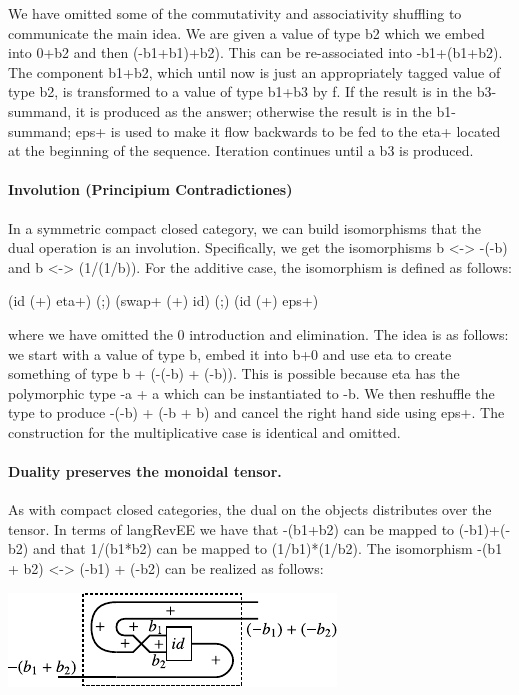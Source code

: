 \documentclass[preprint]{sigplanconf}
\begin{document}
\noindent We have omitted some of the commutativity and associativity
shuffling to communicate the main idea. We are given a value of type
{{b2}} which we embed into {{0+b2}} and then {{(-b1+b1)+b2)}}. This
can be re-associated into {{-b1+(b1+b2)}}. The component {{b1+b2}},
which until now is just an appropriately tagged value of type {{b2}},
is transformed to a value of type {{b1+b3}} by {{f}}. 
If the result is in the {{b3}}-summand, it is produced as
the answer; otherwise the result is in the {{b1}}-summand; {{eps+}} is
used to make it flow backwards to be fed to the {{eta+}} located at
the beginning of the sequence. Iteration continues until a {{b3}} is
produced.


\paragraph*{Involution (Principium Contradictiones)}

In a symmetric compact closed category, we can build isomorphisms that the
dual operation is an involution. Specifically, we get the isomorphisms 
{{b <-> -(-b)}} and {{b <-> (1/(1/b))}}. For the additive case, the 
isomorphism is defined as follows:

{{ (id (+) eta+) (;) (swap+ (+) id) (;) (id (+) eps+) }}

\noindent where we have omitted the 0 introduction and elimination. The idea
is as follows: we start with a value of type {{b}}, embed it into {{b+0}} and
use {{eta}} to create something of type {{b + (-(-b) + (-b))}}. This is possible
because {{eta}} has the polymorphic type {{-a + a}} which can be instantiated
to {{-b}}. We then reshuffle the type to produce {{-(-b) + (-b + b)}} and cancel
the right hand side using {{eps+}}.  The construction for the multiplicative 
case is identical and omitted.


\paragraph*{Duality preserves the monoidal tensor. }
As with compact closed categories, the dual on the objects distributes
over the tensor. In terms of {{langRevEE}} we have that {{-(b1+b2)}}
can be mapped to {{(-b1)+(-b2)}} and that {{1/(b1*b2)}} can be mapped
to {{(1/b1)*(1/b2)}}. The isomorphism {{-(b1 + b2) <-> (-b1) + (-b2)}}
can be realized as follows:
\begin{center}
  \includegraphics{diagrams/dist_neg_plus.pdf}
\end{center}
\end{document}
